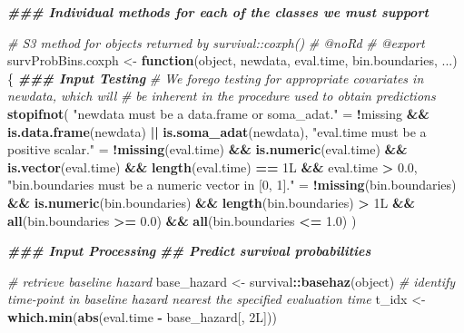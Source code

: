 \documentclass[
]{book}
\newenvironment{Shaded}{\begin{snugshade}}{\end{snugshade}}
\newcommand{\CommentTok}[1]{\textcolor[rgb]{0.56,0.35,0.01}{\textit{#1}}}
\newcommand{\ControlFlowTok}[1]{\textcolor[rgb]{0.13,0.29,0.53}{\textbf{#1}}}
\newcommand{\DocumentationTok}[1]{\textcolor[rgb]{0.56,0.35,0.01}{\textbf{\textit{#1}}}}
\newcommand{\FloatTok}[1]{\textcolor[rgb]{0.00,0.00,0.81}{#1}}
\newcommand{\FunctionTok}[1]{\textcolor[rgb]{0.13,0.29,0.53}{\textbf{#1}}}
\newcommand{\NormalTok}[1]{#1}
\newcommand{\OtherTok}[1]{\textcolor[rgb]{0.56,0.35,0.01}{#1}}
\newcommand{\SpecialCharTok}[1]{\textcolor[rgb]{0.81,0.36,0.00}{\textbf{#1}}}
\newcommand{\StringTok}[1]{\textcolor[rgb]{0.31,0.60,0.02}{#1}}
\begin{document}
\begin{Shaded}
\begin{Highlighting}[]
\DocumentationTok{\#\#\# Individual methods for each of the classes we must support}

\CommentTok{\#\textquotesingle{} S3 method for objects returned by \textasciigrave{}survival::coxph()\textasciigrave{}}
\CommentTok{\#\textquotesingle{} @noRd}
\CommentTok{\#\textquotesingle{} @export}
\NormalTok{survProbBins.coxph }\OtherTok{\textless{}{-}} \ControlFlowTok{function}\NormalTok{(object, newdata, eval.time, bin.boundaries, ...) \{}
  \DocumentationTok{\#\#\# Input Testing}
  \CommentTok{\# We forego testing for appropriate covariates in \textasciigrave{}newdata\textasciigrave{}, which will}
  \CommentTok{\#   be inherent in the procedure used to obtain predictions}
  \FunctionTok{stopifnot}\NormalTok{(}
    \StringTok{"\textasciigrave{}newdata\textasciigrave{} must be a data.frame or soma\_adat."} \OtherTok{=} 
      \SpecialCharTok{!}\NormalTok{missing }\SpecialCharTok{\&\&} \FunctionTok{is.data.frame}\NormalTok{(newdata) }\SpecialCharTok{||} \FunctionTok{is.soma\_adat}\NormalTok{(newdata),}
    \StringTok{"\textasciigrave{}eval.time\textasciigrave{} must be a positive scalar."} \OtherTok{=} 
      \SpecialCharTok{!}\FunctionTok{missing}\NormalTok{(eval.time) }\SpecialCharTok{\&\&} \FunctionTok{is.numeric}\NormalTok{(eval.time) }\SpecialCharTok{\&\&} 
        \FunctionTok{is.vector}\NormalTok{(eval.time) }\SpecialCharTok{\&\&} \FunctionTok{length}\NormalTok{(eval.time) }\SpecialCharTok{==}\NormalTok{ 1L }\SpecialCharTok{\&\&}\NormalTok{ eval.time }\SpecialCharTok{\textgreater{}} \FloatTok{0.0}\NormalTok{,}
    \StringTok{"\textasciigrave{}bin.boundaries\textasciigrave{} must be a numeric vector in [0, 1]."} \OtherTok{=} 
      \SpecialCharTok{!}\FunctionTok{missing}\NormalTok{(bin.boundaries) }\SpecialCharTok{\&\&} \FunctionTok{is.numeric}\NormalTok{(bin.boundaries) }\SpecialCharTok{\&\&}
        \FunctionTok{length}\NormalTok{(bin.boundaries) }\SpecialCharTok{\textgreater{}}\NormalTok{ 1L }\SpecialCharTok{\&\&} \FunctionTok{all}\NormalTok{(bin.boundaries }\SpecialCharTok{\textgreater{}=} \FloatTok{0.0}\NormalTok{) }\SpecialCharTok{\&\&} 
        \FunctionTok{all}\NormalTok{(bin.boundaries }\SpecialCharTok{\textless{}=} \FloatTok{1.0}\NormalTok{)}
\NormalTok{  )}
  
  \DocumentationTok{\#\#\# Input Processing}
  \DocumentationTok{\#\# Predict survival probabilities}
  
  \CommentTok{\# retrieve baseline hazard}
\NormalTok{  base\_hazard }\OtherTok{\textless{}{-}}\NormalTok{ survival}\SpecialCharTok{::}\FunctionTok{basehaz}\NormalTok{(object)}
  \CommentTok{\# identify time{-}point in baseline hazard nearest the specified evaluation time}
\NormalTok{  t\_idx       }\OtherTok{\textless{}{-}} \FunctionTok{which.min}\NormalTok{(}\FunctionTok{abs}\NormalTok{(eval.time }\SpecialCharTok{{-}}\NormalTok{ base\_hazard[, 2L]))}
  

\end{Highlighting}
\end{Shaded}
\end{document}
